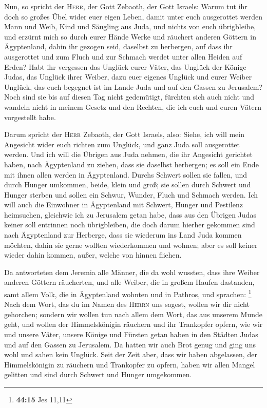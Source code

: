  Nun, so spricht der \textsc{Herr}, der Gott Zebaoth, der
Gott Israels: Warum tut ihr doch so großes Übel wider euer eigen Leben,
damit unter euch ausgerottet werden Mann und Weib, Kind und Säugling aus
Juda, und nichts von euch übrigbleibe,  und erzürnt mich
so durch eurer Hände Werke und räuchert anderen Göttern in Ägyptenland,
dahin ihr gezogen seid, daselbst zu herbergen, auf dass ihr ausgerottet
und zum Fluch und zur Schmach werdet unter allen Heiden auf Erden?
 Habt ihr vergessen das Unglück eurer Väter, das Unglück
der Könige Judas, das Unglück ihrer Weiber, dazu euer eigenes Unglück
und eurer Weiber Unglück, das euch begegnet ist im Lande Juda und auf
den Gassen zu Jerusalem?  Noch sind sie bis auf diesen
Tag nicht gedemütigt, fürchten sich auch nicht und wandeln nicht in
meinem Gesetz und den Rechten, die ich euch und euren Vätern vorgestellt
habe.

 Darum spricht der \textsc{Herr} Zebaoth, der Gott
Israels, also: Siehe, ich will mein Angesicht wider euch richten zum
Unglück, und ganz Juda soll ausgerottet werden.  Und ich
will die Übrigen aus Juda nehmen, die ihr Angesicht gerichtet haben,
nach Ägyptenland zu ziehen, dass sie daselbst herbergen; es soll ein
Ende mit ihnen allen werden in Ägyptenland. Durchs Schwert sollen sie
fallen, und durch Hunger umkommen, beide, klein und groß; sie sollen
durch Schwert und Hunger sterben und sollen ein Schwur, Wunder, Fluch
und Schmach werden.  Ich will auch die Einwohner in
Ägyptenland mit Schwert, Hunger und Pestilenz heimsuchen, gleichwie ich
zu Jerusalem getan habe,  dass aus den Übrigen Judas
keiner soll entrinnen noch übrigbleiben, die doch darum hierher gekommen
sind nach Ägyptenland zur Herberge, dass sie wiederum ins Land Juda
kommen möchten, dahin sie gerne wollten wiederkommen und wohnen; aber es
soll keiner wieder dahin kommen, außer, welche von hinnen fliehen.

 Da antworteten dem Jeremia alle Männer, die da wohl
wussten, dass ihre Weiber anderen Göttern räucherten, und alle Weiber,
die in großem Haufen dastanden, samt allem Volk, die in Ägyptenland
wohnten und in Pathros, und sprachen: \footnote{\textbf{44:15} Jes 11,11}
 Nach dem Wort, das du im Namen des \textsc{Herrn} uns
sagest, wollen wir dir nicht gehorchen;  sondern wir
wollen tun nach allem dem Wort, das aus unserem Munde geht, und wollen
der Himmelskönigin räuchern und ihr Trankopfer opfern, wie wir und
unsere Väter, unsere Könige und Fürsten getan haben in den Städten Judas
und auf den Gassen zu Jerusalem. Da hatten wir auch Brot genug und ging
uns wohl und sahen kein Unglück.  Seit der Zeit aber,
dass wir haben abgelassen, der Himmelskönigin zu räuchern und Trankopfer
zu opfern, haben wir allen Mangel gelitten und sind durch Schwert und
Hunger umgekommen.


